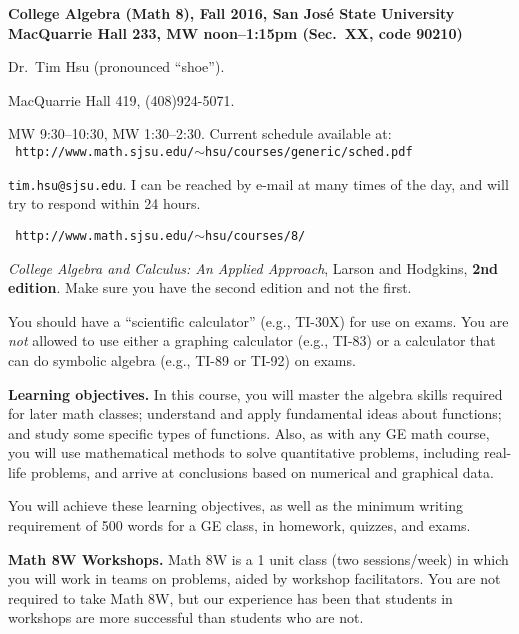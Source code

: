 \documentclass[letterpaper]{article}
\begin{document}
\begin{center}\bf
College Algebra (Math 8), Fall 2016, San Jos\'{e} State University \\
MacQuarrie Hall 233, MW noon--1:15pm (Sec.\ XX, code 90210)
\end{center}

\begin{description}
\setlength{\itemsep}{0in}
\item[Instructor:] Dr.\ Tim Hsu (pronounced ``shoe'').
\item[Office and phone:] MacQuarrie Hall 419, (408)924-5071.
\item[Office hours:] MW 9:30--10:30, MW 1:30--2:30.  Current schedule
available at: \\ {\tt
http://www.math.sjsu.edu/$\sim$hsu/courses/generic/sched.pdf\/}
\item[E-mail:] {\tt tim.hsu@sjsu.edu}.  I can be reached by e-mail at
many times of the day, and will try to respond within 24 hours.
\item[Course web page:] {\tt
    http://www.math.sjsu.edu/$\sim$hsu/courses/8/}
\item[Texts:] {\it College Algebra and Calculus: An Applied Approach},
	Larson and Hodgkins, {\bf 2nd edition}.  Make sure you have the second
	edition and not the first.
\item[Calculator:] You should have a ``scientific calculator'' (e.g.,
  TI-30X) for use on exams.  You are {\it not\/} allowed to use either
  a graphing calculator (e.g., TI-83) or a calculator that can do symbolic
  algebra (e.g., TI-89 or TI-92) on exams.
\end{description}

{\bf Learning objectives.}  In this course, you will master the
algebra skills required for later math classes; understand and apply
fundamental ideas about functions; and study some
specific types of functions.
Also, as with any GE math course,
you will use mathematical methods to solve quantitative problems,
including real-life problems, and arrive at conclusions based on
numerical and graphical data.

You will achieve these learning objectives, as well as the minimum
writing requirement of 500 words for a GE class, in homework, quizzes, and exams.

{\bf Math 8W Workshops.\/} Math 8W is a 1 unit class (two sessions/week)
in which you will work in teams on problems, aided by
workshop facilitators.  You are not required to take Math 8W, but
our experience has been that students in workshops are more
successful than students who are not.
\end{document}
